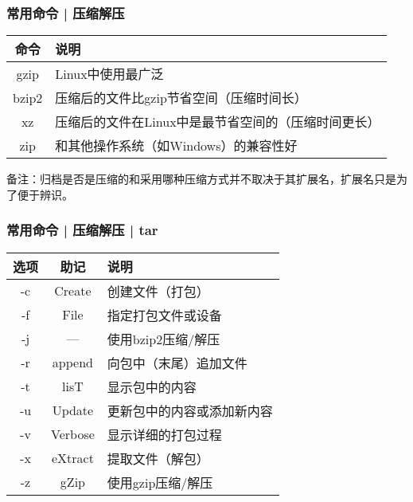 \begin{frame}
  \frametitle{常用命令 | \alert{压缩解压}}
  \begin{table}
    \centering
    \begin{tabularx}{\textwidth}{cX}
      \hline
      \rowcolor{blue!50}命令 & 说明\\
      \hline
      gzip & Linux中使用最广泛\\
      bzip2 & 压缩后的文件比gzip节省空间（压缩时间长）\\
      xz & 压缩后的文件在Linux中是最节省空间的（压缩时间更长）\\
      zip & 和其他操作系统（如Windows）的兼容性好\\
      \hline
    \end{tabularx}
  \end{table}
  备注：归档是否是压缩的和采用哪种压缩方式并不取决于其扩展名，扩展名只是为了便于辨识。
\end{frame}

\begin{frame}
  \frametitle{常用命令 | 压缩解压 | \alert{tar}}
  \begin{table}
    \centering
    \begin{tabularx}{0.9\textwidth}{ccX}
      \hline
      \rowcolor{blue!50}选项 & 助记 & 说明\\
      \hline
      -c & Create & 创建文件（打包）\\
      -f & File & 指定打包文件或设备\\
      -j & --- & 使用bzip2压缩/解压\\
      -r & append & 向包中（末尾）追加文件\\
      -t & lisT & 显示包中的内容\\
      -u & Update & 更新包中的内容或添加新内容\\
      -v & Verbose & 显示详细的打包过程\\
      -x & eXtract & 提取文件（解包）\\
      -z & gZip & 使用gzip压缩/解压\\
      \hline
    \end{tabularx}
  \end{table}
\end{frame}


